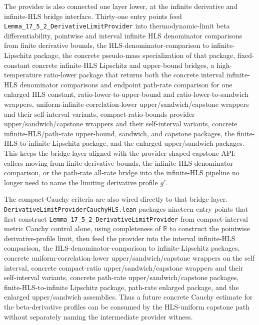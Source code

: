\documentclass[a4paper,11pt]{article}
\begin{document}
The provider is also connected one layer lower, at the infinite derivative and
infinite-HLS bridge interface.  Thirty-one entry points feed
\texttt{Lemma\_17\_5\_2\_DerivativeLimitProvider} into thermodynamic-limit
beta differentiability, pointwise and interval infinite HLS denominator
comparisons from finite derivative bounds, the HLS-denominator-comparison to
infinite-Lipschitz package, the concrete pseudo-mass specialization of that
package, fixed-constant concrete infinite-HLS Lipschitz and upper-bound bridges,
a high-temperature ratio-lower package that returns both the concrete interval
infinite-HLS denominator comparisons and endpoint path-rate comparison for one
enlarged HLS constant, ratio-lower-to-upper-bound and
ratio-lower-to-sandwich wrappers, uniform-infinite-correlation-lower
upper/sandwich/capstone wrappers and their self-interval variants,
compact-ratio-bounds provider
upper/sandwich/capstone wrappers and their self-interval variants,
concrete infinite-HLS/path-rate upper-bound,
sandwich, and capstone packages, the
finite-HLS-to-infinite Lipschitz package, and the enlarged upper/sandwich
packages.  This keeps the bridge layer aligned with
the provider-shaped capstone API: callers moving from finite derivative bounds,
the infinite HLS denominator comparison, or the path-rate all-rate bridge into
the infinite-HLS pipeline no longer need to name the limiting derivative
profile \(g'\).

The compact-Cauchy criteria are also wired directly to that bridge layer.
\texttt{DerivativeLimitProviderCauchyHLS.lean} packages nineteen entry points
that
first construct \texttt{Lemma\_17\_5\_2\_DerivativeLimitProvider} from
compact-interval metric Cauchy control alone, using completeness of
\(\mathbb{R}\) to construct the pointwise derivative-profile limit, then feed
the provider into the interval infinite-HLS comparison,
the HLS-denominator-comparison to infinite-Lipschitz packages,
concrete uniform-correlation-lower upper/sandwich/capstone wrappers on the self
interval, concrete compact-ratio upper/sandwich/capstone wrappers and their
self-interval variants, concrete path-rate upper/sandwich/capstone packages,
finite-HLS-to-infinite Lipschitz package, path-rate enlarged package, and the
enlarged upper/sandwich assemblies.  Thus a future concrete Cauchy estimate
for the beta-derivative profiles can be consumed by the HLS-uniform capstone
path without separately naming the intermediate provider witness.
\end{document}
